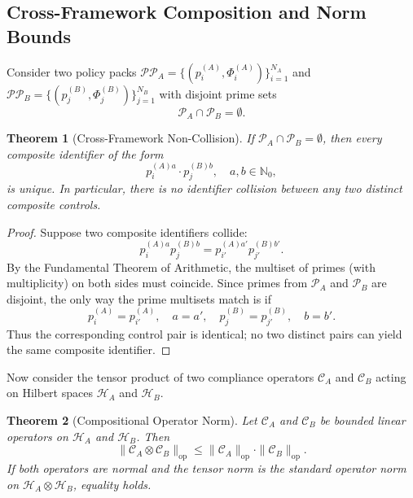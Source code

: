 \documentclass[12pt,letterpaper]{article}
\theoremstyle{definition}
\theoremstyle{plain}
\newtheorem{theorem}{Theorem}[section]
\theoremstyle{remark}
\begin{document}
\subsection{Cross-Framework Composition and Norm Bounds}
\label{subsec:cross-framework}

Consider two policy packs \(\mathcal{PP}_A = \{(p_i^{(A)}, \Phi_i^{(A)})\}_{i=1}^{N_A}\) and \(\mathcal{PP}_B = \{(p_j^{(B)}, \Phi_j^{(B)})\}_{j=1}^{N_B}\) with disjoint prime sets
\[
\mathcal{P}_A \cap \mathcal{P}_B = \emptyset.
\]

\begin{theorem}[Cross-Framework Non-Collision]
If \(\mathcal{P}_A \cap \mathcal{P}_B = \emptyset\), then every composite identifier of the form
\[
p_i^{(A)a} \cdot p_j^{(B)b}, \quad a,b \in \mathbb{N}_0,
\]
is unique. In particular, there is no identifier collision between any two distinct composite controls.
\end{theorem}

\begin{proof}
Suppose two composite identifiers collide:
\[
p_i^{(A)a} p_j^{(B)b} = p_{i'}^{(A)a'} p_{j'}^{(B)b'}.
\]
By the Fundamental Theorem of Arithmetic, the multiset of primes (with multiplicity) on both sides must coincide. Since primes from \(\mathcal{P}_A\) and \(\mathcal{P}_B\) are disjoint, the only way the prime multisets match is if
\[
p_i^{(A)} = p_{i'}^{(A)},\quad a = a',\quad p_j^{(B)} = p_{j'}^{(B)},\quad b = b'.
\]
Thus the corresponding control pair is identical; no two distinct pairs can yield the same composite identifier.
\end{proof}

Now consider the tensor product of two compliance operators \(\mathcal{C}_A\) and \(\mathcal{C}_B\) acting on Hilbert spaces \(\mathcal{H}_A\) and \(\mathcal{H}_B\).

\begin{theorem}[Compositional Operator Norm]
Let \(\mathcal{C}_A\) and \(\mathcal{C}_B\) be bounded linear operators on \(\mathcal{H}_A\) and \(\mathcal{H}_B\). Then
\[
\|\mathcal{C}_A \otimes \mathcal{C}_B\|_{\mathrm{op}} \le \|\mathcal{C}_A\|_{\mathrm{op}} \cdot \|\mathcal{C}_B\|_{\mathrm{op}}.
\]
If both operators are normal and the tensor norm is the standard operator norm on \(\mathcal{H}_A \otimes \mathcal{H}_B\), equality holds.
\end{theorem}
\end{document}
